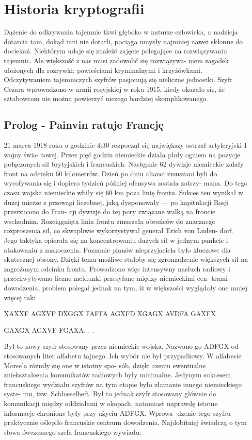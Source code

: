 \documentclass[a4paper]{article}
\begin{document}
\section{Historia kryptografii}
Dążenie do odkrywania tajemnic tkwi głęboko w naturze człowieka, a nadzieja dotarcia tam, dokąd
inni nie dotarli, pociąga umysły najmniej nawet skłonne do dociekań. Niektórym udaje się znaleźć
zajęcie polegające na rozwiązywaniu tajemnic. Ale większość z nas musi zadowolić się rozwiązywa-
niem zagadek ułożonych dla rozrywki: powieściami kryminalnymi i krzyżówkami. Odczytywaniem
tajemniczych szyfrów pasjonują się nieliczne jednostki.
Szyfr Cezara wprowadzono w armii rosyjskiej w roku 1915, kiedy okazało się, że sztabowcom nie
można powierzyć niczego bardziej skomplikowanego.

\subsection{Prolog - Painvin ratuje Francję}
21 marca 1918 roku o godzinie 4:30 rozpoczął się największy ostrzał artyleryjski I wojny świa-
towej. Przez pięć godzin niemieckie działa pluły ogniem na pozycje połączonych sił brytyjskich
i francuskich. Następnie 62 dywizje niemieckie zalały front na odcinku 60 kilometrów. Dzień po
dniu alianci zmuszani byli do wycofywania się i dopiero tydzień później ofensywa została zatrzy-
mana. Do tego czasu wojska niemieckie wbiły się 60 km poza linię frontu. Sukces ten wynikał w
dużej mierze z przewagi liczebnej, jaką dysponowały — po kapitulacji Rosji przerzucono do Fran-
cji dywizje do tej pory związane walką na froncie wschodnim. Rozciągnięta linia frontu zmuszała
obrońców do znacznego rozproszenia sił, co skwapliwie wykorzystywał generał Erich von Luden-
dorf. Jego taktyka opierała się na koncentrowaniu dużych sił w jednym punkcie i atakowaniu z
zaskoczenia. Poznanie planów nieprzyjaciela było kluczowe dla skutecznej obrony. Dzięki temu
możliwe stałoby się zgromadzenie większych sił na zagrożonym odcinku frontu. Prowadzono więc
intensywny nasłuch radiowy i przechwytywano liczne meldunki przesyłane między niemieckimi cen-
trami dowodzenia, problem polegał jednak na tym, iż w większości wyglądały one mniej więcej tak:
\\

\par XAXXF AGXVF DXGGX FAFFA AGXFD XGAGX AVDFA GAXFX
\par GAXGX AGXVF FGAXA. . .
\\

\raggedright
Był to nowy szyfr stosowany przez niemieckie wojska. Nazwano go ADFGX od stosowanych liter
alfabetu tajnego. Ich wybór nie był przypadkowy. W alfabecie Morse’a różniły się one w istotny spo-
sób, dzięki czemu ewentualne zniekształcenia komunikatów radiowych były minimalne. Jedynym
sukcesem francuskiego wydziału szyfrów na tym etapie było złamanie innego niemieckiego syste-
mu, tzw. Schlusselheft. Był to jednak szyfr stosowany głównie do komunikacji między oddziałami
w okopach, natomiast naprawdę istotne informacje chronione były przy użyciu ADFGX. Wprowa-
dzenie tego szyfru praktycznie oślepiło francuskie centrum dowodzenia. Najdobitniej świadczą o
tym słowa ówczesnego szefa francuskiego wywiadu:
\end{document}
